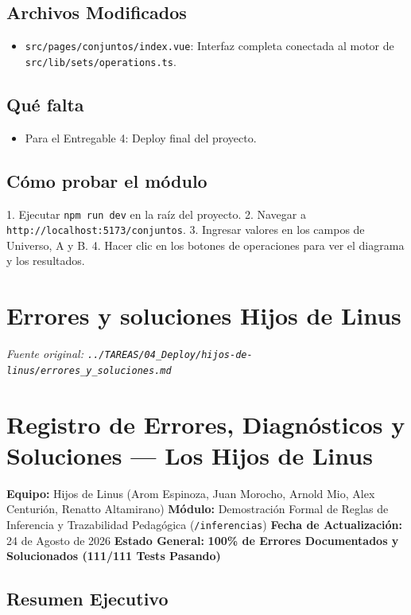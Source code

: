 \documentclass[11pt,a4paper,openany]{book}
\begin{document}
\subsection{Archivos Modificados}
\begin{itemize}[leftmargin=*]
\item \texttt{src/pages/conjuntos/index.vue}: Interfaz completa conectada al motor de \texttt{src/lib/sets/operations.ts}.
\end{itemize}

\subsection{Qué falta}
\begin{itemize}[leftmargin=*]
\item Para el Entregable 4: Deploy final del proyecto.
\end{itemize}

\subsection{Cómo probar el módulo}
1. Ejecutar \texttt{npm run dev} en la raíz del proyecto.
2. Navegar a \texttt{http://localhost:5173/conjuntos}.
3. Ingresar valores en los campos de Universo, A y B.
4. Hacer clic en los botones de operaciones para ver el diagrama y los resultados.


\section{Errores y soluciones Hijos de Linus}
\textit{Fuente original: \texttt{../TAREAS/04\_Deploy/hijos-de-linus/errores\_y\_soluciones.md}}

\section{Registro de Errores, Diagnósticos y Soluciones --- Los Hijos de Linus}

\textbf{Equipo:} Hijos de Linus (Arom Espinoza, Juan Morocho, Arnold Mio, Alex Centurión, Renatto Altamirano)
\textbf{Módulo:} Demostración Formal de Reglas de Inferencia y Trazabilidad Pedagógica (\texttt{/inferencias})
\textbf{Fecha de Actualización:} 24 de Agosto de 2026
\textbf{Estado General:}  \textbf{100\% de Errores Documentados y Solucionados (111/111 Tests Pasando)}

\hrulefill

\subsection{Resumen Ejecutivo}
\end{document}
